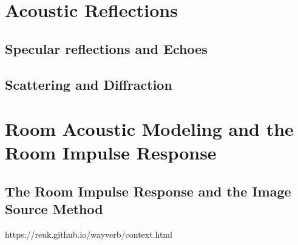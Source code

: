 




\section{Acoustic Reflections}
\subsection{Specular reflections and Echoes}

\subsection{Scattering and Diffraction}

\section{Room Acoustic Modeling and the Room Impulse Response}

\subsection{The Room Impulse Response and the Image Source Method}
https://reuk.github.io/wayverb/context.html

